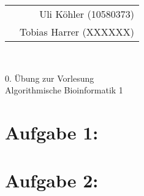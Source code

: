 \documentclass[a4paper,12pt,leqno]{scrartcl}
\begin{document}
{\scriptsize
\noindent\begin{tabular*}{\textwidth}{@{\extracolsep{\fill}}lr}
& Uli Köhler (10580373)\\
& Tobias Harrer (XXXXXX)
\end{tabular*}
}
\\
\begin{center}
\large 0. Übung zur Vorlesung\\
\Huge Algorithmische Bioinformatik 1
\end{center}\vspace{1cm}
\section*{Aufgabe 1:}
\section*{Aufgabe 2:}
\end{document}
